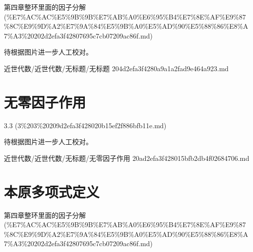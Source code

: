 \begin{note}[来源上级主题]

第四章整环里面的因子分解 (\%E7\%AC\%AC\%E5\%9B\%9B\%E7\%AB\%A0\%E6\%95\%B4\%E7\%8E\%AF\%E9\%87\%8C\%E9\%9D\%A2\%E7\%9A\%84\%E5\%9B\%A0\%E5\%AD\%90\%E5\%88\%86\%E8\%A7\%A3\%20202d2efa3f42807695c7cb07209ac86f.md)

\end{note}

\begin{note}[无标题]

待根据图片进一步人工校对。

\end{note}

\begin{note}[来源路径]

近世代数/近世代数/无标题/无标题 204d2efa3f4280a9a1a2fad9e464a923.md

\end{note}

\section*{无零因子作用}

\begin{note}[来源上级主题]

3.3 (3\%203\%20209d2efa3f428020b15ef2f886bfb11e.md)

\end{note}

\begin{note}[无零因子作用]

待根据图片进一步人工校对。

\end{note}

\begin{note}[来源路径]

近世代数/近世代数/无标题/无零因子作用 20ad2efa3f428015bfb2db4f02684706.md

\end{note}

\section*{本原多项式定义}

\begin{note}[来源上级主题]

第四章整环里面的因子分解 (\%E7\%AC\%AC\%E5\%9B\%9B\%E7\%AB\%A0\%E6\%95\%B4\%E7\%8E\%AF\%E9\%87\%8C\%E9\%9D\%A2\%E7\%9A\%84\%E5\%9B\%A0\%E5\%AD\%90\%E5\%88\%86\%E8\%A7\%A3\%20202d2efa3f42807695c7cb07209ac86f.md)

\end{note}

